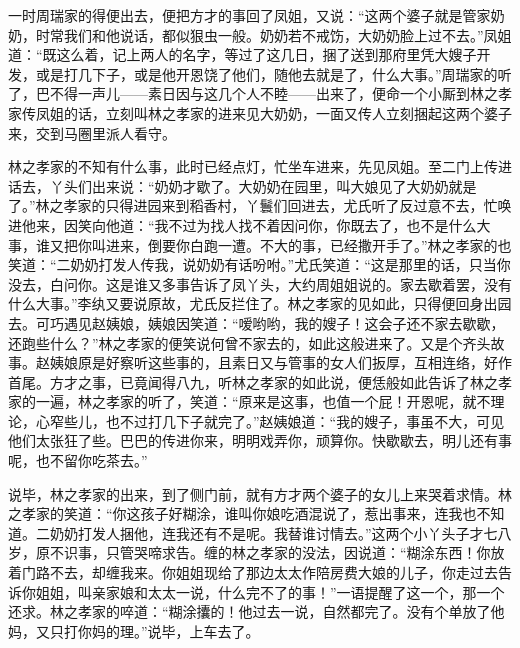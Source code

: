 一时周瑞家的得便出去，便把方才的事回了凤姐，又说：“这两个婆子就是管家奶奶，时常我们和他说话，都似狠虫一般。奶奶若不戒饬，大奶奶脸上过不去。”凤姐道：“既这么着，记上两人的名字，等过了这几日，捆了送到那府里凭大嫂子开发，或是打几下子，或是他开恩饶了他们，随他去就是了，什么大事。”周瑞家的听了，巴不得一声儿------素日因与这几个人不睦------出来了，便命一个小厮到林之孝家传凤姐的话，立刻叫林之孝家的进来见大奶奶，一面又传人立刻捆起这两个婆子来，交到马圈里派人看守。

林之孝家的不知有什么事，此时已经点灯，忙坐车进来，先见凤姐。至二门上传进话去，丫头们出来说：“奶奶才歇了。大奶奶在园里，叫大娘见了大奶奶就是了。”林之孝家的只得进园来到稻香村，丫鬟们回进去，尤氏听了反过意不去，忙唤进他来，因笑向他道：“我不过为找人找不着因问你，你既去了，也不是什么大事，谁又把你叫进来，倒要你白跑一遭。不大的事，已经撒开手了。”林之孝家的也笑道：“二奶奶打发人传我，说奶奶有话吩咐。”尤氏笑道：“这是那里的话，只当你没去，白问你。这是谁又多事告诉了凤丫头，大约周姐姐说的。家去歇着罢，没有什么大事。”李纨又要说原故，尤氏反拦住了。林之孝家的见如此，只得便回身出园去。可巧遇见赵姨娘，姨娘因笑道：“嗳哟哟，我的嫂子！这会子还不家去歇歇，还跑些什么？”林之孝家的便笑说何曾不家去的，如此这般进来了。又是个齐头故事。赵姨娘原是好察听这些事的，且素日又与管事的女人们扳厚，互相连络，好作首尾。方才之事，已竟闻得八九，听林之孝家的如此说，便恁般如此告诉了林之孝家的一遍，林之孝家的听了，笑道：“原来是这事，也值一个屁！开恩呢，就不理论，心窄些儿，也不过打几下子就完了。”赵姨娘道：“我的嫂子，事虽不大，可见他们太张狂了些。巴巴的传进你来，明明戏弄你，顽算你。快歇歇去，明儿还有事呢，也不留你吃茶去。”

说毕，林之孝家的出来，到了侧门前，就有方才两个婆子的女儿上来哭着求情。林之孝家的笑道：“你这孩子好糊涂，谁叫你娘吃酒混说了，惹出事来，连我也不知道。二奶奶打发人捆他，连我还有不是呢。我替谁讨情去。”这两个小丫头子才七八岁，原不识事，只管哭啼求告。缠的林之孝家的没法，因说道：“糊涂东西！你放着门路不去，却缠我来。你姐姐现给了那边太太作陪房费大娘的儿子，你走过去告诉你姐姐，叫亲家娘和太太一说，什么完不了的事！”一语提醒了这一个，那一个还求。林之孝家的啐道：“糊涂攮的！他过去一说，自然都完了。没有个单放了他妈，又只打你妈的理。”说毕，上车去了。

